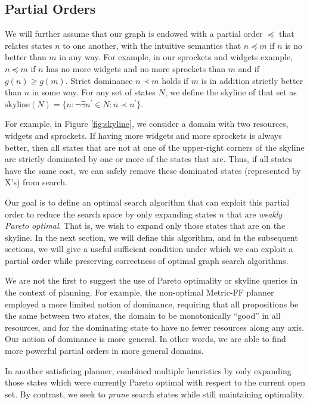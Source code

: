 \documentclass[letterpaper]{article}
\theoremstyle{plain} \newtheorem{theorem}{Theorem} \newtheorem{proposition}{Proposition} \newtheorem{lemma}{Lemma}
\theoremstyle{definition} \newtheorem{definition}{Definition} \newtheorem{conjecture}{Conjecture} \newtheorem*{example}{Example}
\theoremstyle{remark} \newtheorem*{remark}{Remark} \newtheorem*{note}{Note} \newtheorem{case}{Case}
\begin{document}
\subsection{Partial Orders}

We will further assume that our graph is endowed with a partial
order $\preceq$ that relates states $n$ to one another, with the
intuitive semantics that $n \preceq m$ if $n$ is no better than $m$
in any way. For example, in our sprockets and widgets example, $n
\preceq m$ if $n$ has no more widgets and no more sprockets than
$m$ and if $g(n) \ge g(m)$. Strict dominance $n \prec m$ holds if
$m$ is in addition strictly better than $n$ in some way.  For any
set of states $N$, we define the skyline of that set as
$\textrm{skyline}(N)=\{n: \neg\exists n^\prime \in N: n \prec
n^\prime\}$. 

For example, in Figure \ref{fig:skyline}, we consider a domain with
two resources, widgets and sprockets. If having more widgets and
more sprockets is always better, then all states that are not at one
of the upper-right corners of the skyline are strictly dominated by one or more
of the states that are.  Thus, if all states have the same cost,
we can safely remove these dominated states (represented by X's) from search.

Our goal is to define an optimal search algorithm that can exploit
this partial order to reduce the search space by only expanding
states $n$ that are \textit{weakly Pareto optimal}. That is, we
wish to expand only those states that are on the skyline. In the
next section, we will define this algorithm, and in the subsequent
sections, we will give a useful sufficient condition under which
we can exploit a partial order while preserving correctness of
optimal graph search algorithms.

We are not the first to suggest the use of Pareto optimality or
skyline queries in the context of planning. For example, the
non-optimal Metric-FF planner~\citep{hoffmann2003metric} employed
a more limited notion of dominance, requiring that all propositions
be the same between two states, the domain to be monotonically
``good'' in all resources, and for the dominating state to have no
fewer resources along any axis. Our notion of dominance is more
general. In other words, we are able to find more powerful partial
orders in more general domains.

In another satisficing planner, \citet{roger2010more} combined
multiple heuristics by only expanding those states which were
currently Pareto optimal with respect to the current open set.  By
contrast, we seek to \textit{prune} search states while still
maintaining optimality.
\end{document}
